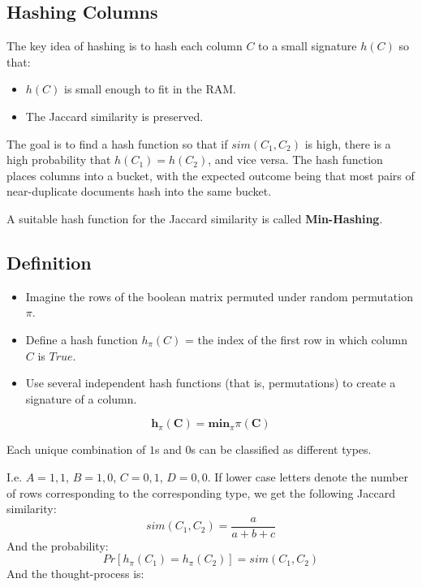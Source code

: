 \subsection{Hashing Columns}
The key idea of hashing is to hash each column $C$ to a small signature $h(C)$ so that:
\begin{itemize}
 \item $h(C)$ is small enough to fit in the RAM.
 \item The Jaccard similarity is preserved.
\end{itemize}

The goal is to find a hash function so that if $sim(C_1, C_2)$ is high, there is a high probability that $h(C_1) = h(C_2)$, and vice versa.
The hash function places columns into a bucket, with the expected outcome being that most pairs of near-duplicate documents hash into the same bucket.

\bigskip

A suitable hash function for the Jaccard similarity is called \textbf{Min-Hashing}.

\subsection{Definition}
\begin{itemize}
 \item Imagine the rows of the boolean matrix permuted under random permutation $\pi$.
 \item Define a hash function $h_\pi(C)$ = the index of the first row in which column $C$ is $True$.
 \item Use several independent hash functions (that is, permutations) to create a signature of a column.
\end{itemize}

\begin{equation}
 \bm{h}_\pi\bm{(C)} = \bm{min}_\pi\pi\bm{(C)}
\end{equation}

Each unique combination of $1$s and $0$s can be classified as different types.

I.e. $A = 1, 1$, $B = 1, 0$, $C = 0, 1$, $D = 0, 0$.
If lower case letters denote the number of rows corresponding to the corresponding type, we get the following Jaccard similarity:
\begin{equation}
 sim(C_1, C_2) = \frac{a}{a+b+c}
\end{equation}
And the probability:
\begin{equation}
 Pr\left[h_\pi(C_1) = h_\pi(C_2)\right] = sim(C_1, C_2)
\end{equation}
And the thought-process is:

